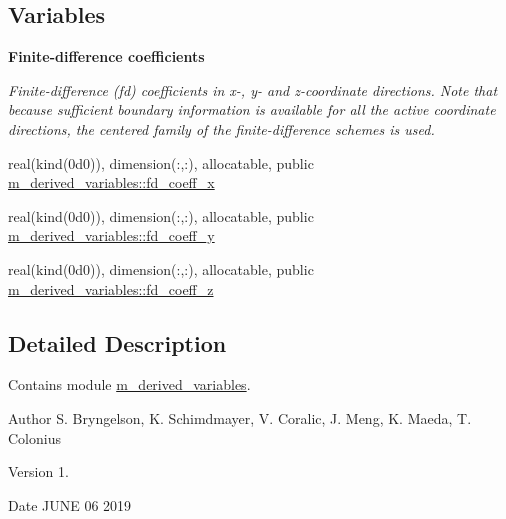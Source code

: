 \subsection*{Variables}
\begin{Indent}\textbf{ Finite-\/difference coefficients}\par
{\em Finite-\/difference (fd) coefficients in x-\/, y-\/ and z-\/coordinate directions. Note that because sufficient boundary information is available for all the active coordinate directions, the centered family of the finite-\/difference schemes is used. }\begin{DoxyCompactItemize}
\item 
real(kind(0d0)), dimension(\+:,\+:), allocatable, public \hyperlink{namespacem__derived__variables_a4f61d6bef7f53e49a0f5e4a3f9577912}{m\+\_\+derived\+\_\+variables\+::fd\+\_\+coeff\+\_\+x}
\item 
real(kind(0d0)), dimension(\+:,\+:), allocatable, public \hyperlink{namespacem__derived__variables_ab273055cd131e3ce73c1f468b78af7b7}{m\+\_\+derived\+\_\+variables\+::fd\+\_\+coeff\+\_\+y}
\item 
real(kind(0d0)), dimension(\+:,\+:), allocatable, public \hyperlink{namespacem__derived__variables_a3cafc9204d5773653e119ce3a3b98722}{m\+\_\+derived\+\_\+variables\+::fd\+\_\+coeff\+\_\+z}
\end{DoxyCompactItemize}
\end{Indent}


\subsection{Detailed Description}
Contains module \hyperlink{namespacem__derived__variables}{m\+\_\+derived\+\_\+variables}. 

\begin{DoxyAuthor}{Author}
S. Bryngelson, K. Schimdmayer, V. Coralic, J. Meng, K. Maeda, T. Colonius 
\end{DoxyAuthor}
\begin{DoxyVersion}{Version}
1. 
\end{DoxyVersion}
\begin{DoxyDate}{Date}
J\+U\+NE 06 2019 
\end{DoxyDate}
